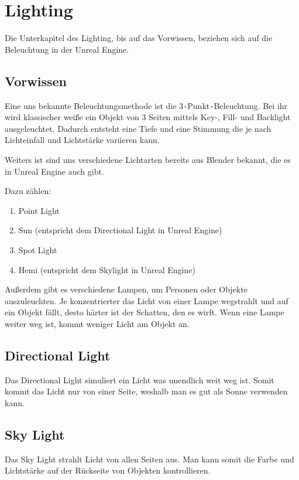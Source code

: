 \section{Lighting}
Die Unterkapitel des Lighting, bis auf das Vorwissen, beziehen sich auf die Beleuchtung in der Unreal Engine.

\subsection{Vorwissen}
Eine uns bekannte Beleuchtungsmethode ist die 3\verb+-+Punkt\verb+-+Beleuchtung. Bei ihr wird klassischer weiße ein Objekt
von 3 Seiten mittels Key-, Fill- und Backlight ausgeleuchtet. Dadurch entsteht eine Tiefe und eine Stimmung die je nach Lichteinfall und
Lichtstärke variieren kann.

Weiters ist sind uns verschiedene Lichtarten bereits aus Blender bekannt, die es in Unreal Engine auch gibt.

Dazu zählen:

\begin{enumerate}
    \item Point Light
    \item Sun (entspricht dem Directional Light in Unreal Engine)
    \item Spot Light
    \item Hemi (entspricht dem Skylight in Unreal Engine)
\end{enumerate}

Außerdem gibt es verschiedene Lampen, um Personen oder Objekte auszuleuchten. Je konzentrierter das Licht von einer Lampe wegstrahlt und auf ein Objekt
fällt, desto härter ist der Schatten, den es wirft. Wenn eine Lampe weiter weg ist, kommt weniger Licht am Objekt an.

\subsection{Directional Light}
Das Directional Light simuliert ein Licht was unendlich weit weg ist. Somit kommt das Licht nur von einer Seite, weshalb
man es gut als Sonne verwenden kann. \citep{unreal:directional_light}

\subsection{Sky Light}
Das Sky Light strahlt Licht von allen Seiten aus. Man kann somit die Farbe und Lichtstärke auf der Rückseite von Objekten kontrollieren.

